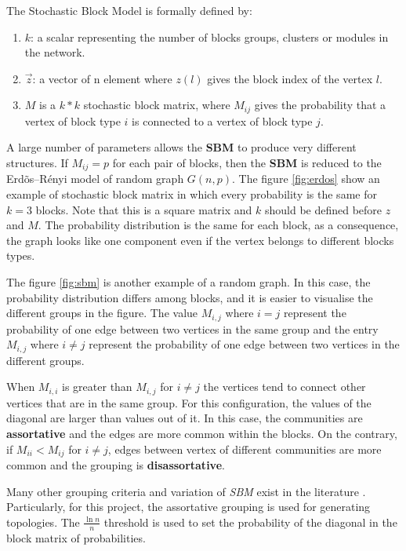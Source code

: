 The Stochastic Block Model is formally defined by: 
\begin{enumerate}

    \item $k$: a scalar representing the number of blocks groups, clusters or modules in the network.
    \item $\overrightarrow{z}$: a vector of n element where $z(l)$ gives the block index of the vertex $l$.
    \item $M$ is a $k * k$ stochastic block matrix, where $M_{ij}$ gives the probability that a vertex of block type $i$ is connected to a vertex of block type $j$.
\end{enumerate}



A large number of parameters allows the \textbf{SBM} to produce very different structures. If $M_{ij} = p$ for each pair of blocks, then the \textbf{SBM} is reduced to the Erd\~os--R\'enyi model of random graph $G(n,p)$. The figure \ref{fig:erdos} show an example of stochastic block matrix in which every probability is the same for $k = 3$ blocks. Note that this is a square matrix and $k$ should be defined before $z$ and $M$. The probability distribution is the same for each block, as a consequence, the graph looks like one component even if the vertex belongs to different blocks types.

 The figure \ref{fig:sbm} is another example of a random graph. In this case, the probability distribution differs among blocks, and it is easier to visualise the different groups in the figure. The value $M_{i,j}$ where $i = j$ represent the probability of one edge between two vertices in the same group and the entry $M_{i,j}$ where $i \neq j$ represent the probability of one edge between two vertices in the different groups. 

When $M_{i,i}$ is greater than $M_{i,j}$ for $i \neq j$ the vertices tend to connect other vertices that are in the same group. For this configuration, the values of the diagonal are larger than values out of it. In this case, the communities are \textbf{assortative} and the edges are more common within the blocks. On the contrary, if $M_{ii} <  M_{ij}$ for $i \neq j$, edges between vertex of different communities are more common and the grouping is \textbf{disassortative}.


Many other grouping criteria and variation of \textit{SBM} exist in the literature \cite{carrington2005models,holland1983stochastic,airoldi2008mixed}. Particularly, for this project, the assortative grouping is used for generating topologies. The ${\tfrac {\ln n}{n}}$ threshold is used to set the probability of the diagonal in the block matrix of probabilities. 

